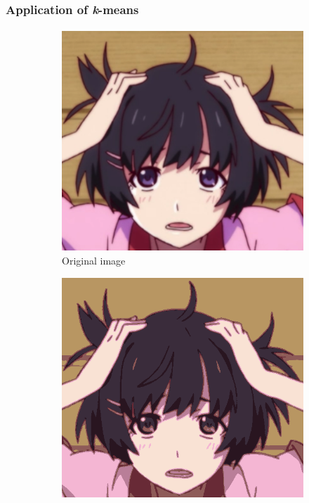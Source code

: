 \documentclass{beamer}                             %
\begin{document}
\begin{frame}
\frametitle{Application of \textit{k}-means}
\framesubtitle{}
\begin{figure}[h!]
    \centering
    \begin{subfigure}[h]{0.32 \textwidth}
      \includegraphics[scale=0.16]{hanekawa.png}
      \caption{Original image}
    \end{subfigure}
    \hfill
    \begin{subfigure}[h]{0.32 \textwidth}
      \includegraphics[scale=0.16]{hanekawa8.png}

\end{subfigure}
\end{figure}
\end{frame}
\end{document}
